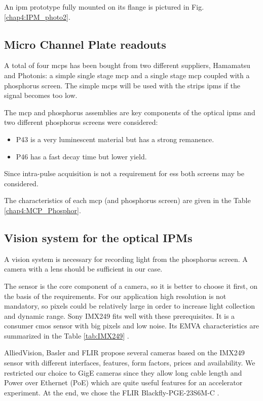 \begin{refsection}
  An \acrshort{ipm} prototype fully mounted on its flange is pictured in Fig. \ref{chap4:IPM_photo2}.

  

  \subsection{Micro Channel Plate readouts}
  A total of four \acrshort{mcp}s has been bought from two different suppliers, Hamamatsu and Photonis: a simple single stage \acrshort{mcp} and a single stage \acrshort{mcp} coupled with a phosphorus screen. The simple \acrshort{mcp}s will be used with the strips \acrshort{ipm}s if the signal becomes too low.

  The \acrshort{mcp} and phosphorus assemblies are key components of the optical \acrshort{ipm}s and two different phosphorus screens were considered:
  \begin{itemize}
    \item P43 is a very luminescent material but has a strong remanence.
    \item P46 has a fast decay time but lower yield.
  \end{itemize}
  Since intra-pulse acquisition is not a requirement for \acrshort{ess} both screens may be considered.

  The characteristics of each \acrshort{mcp} (and phosphorus screen) are given in the Table \ref{chap4:MCP_Phosphor}.
  

  \subsection{Vision system for the optical IPMs}
  A vision system is necessary for recording light from the phosphorus screen.
  A camera with a lens should be sufficient in our case.

  The sensor is the core component of a camera, so it is better to choose it first, on the basis of the requirements.
  For our application high resolution is not mandatory, so pixels could be relatively large in order to increase light collection and dynamic range.
  Sony IMX249 fits well with these prerequisites. It is a consumer \acrshort{cmos} sensor with big pixels and low noise.
  Its EMVA characteristics are summarized in the Table \ref{tab:IMX249} \cite{emva2010}.
  

  AlliedVision, Basler and FLIR propose several cameras based on the IMX249 sensor with different interfaces, features, form factors, prices and availability.
  We restricted our choice to GigE cameras since they allow long cable length and Power over Ethernet (PoE) which are quite useful features for an accelerator experiment.
  At the end, we chose the FLIR Blackfly-PGE-23S6M-C \cite{blackfly2019}.


\end{refsection}
